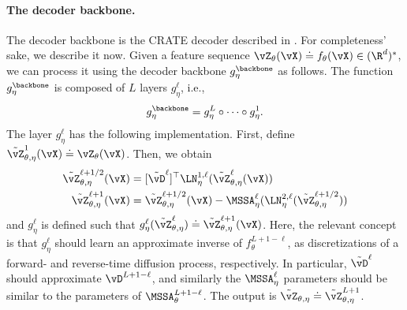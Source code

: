 \documentclass[../../book-main.tex]{subfiles}
\begin{document}
\paragraph{The decoder backbone.} The decoder backbone is the CRATE decoder described in . For completeness' sake, we describe it now. Given a feature sequence \(\vZ_{\theta}(\vX) \doteq f_{\theta}(\vX) \in (\R^{d})^{*}\), we can process it using the decoder backbone \(g_{\eta}^{\backbone}\) as follows. The function \(g_{\eta}^{\backbone}\) is composed of \(L\) layers \(g_{\eta}^{\ell}\), i.e.,
\begin{equation}
    g_{\eta}^{\backbone} = g_{\eta}^{L} \circ \cdots \circ g_{\eta}^{1}.
\end{equation}
The layer \(g_{\eta}^{\ell}\) has the following implementation. First, define \(\tilde{\vZ}_{\theta, \eta}^{1}(\vX) \doteq \vZ_{\theta}(\vX)\). Then, we obtain
\begin{align}
    \tilde{\vZ}_{\theta, \eta}^{\ell + 1/2}(\vX) 
    &= [\tilde{\vD}^{\ell}]^{\top}\LN_{\eta}^{1, \ell}(\tilde{\vZ}_{\theta, \eta}^{\ell}(\vX)) \\ 
    \tilde{\vZ}_{\theta, \eta}^{\ell + 1}(\vX)
    &= \tilde{\vZ}_{\theta, \eta}^{\ell + 1/2}(\vX) - \MSSA_{\eta}^{\ell}(\LN_{\eta}^{2, \ell}(\tilde{\vZ}_{\theta, \eta}^{\ell + 1/2}))
\end{align}
and \(g_{\eta}^{\ell}\) is defined such that \(g_{\eta}^{\ell}(\tilde{\vZ}_{\theta, \eta}^{\ell}) \doteq \tilde{\vZ}_{\theta, \eta}^{\ell + 1}(\vX)\). Here, the relevant concept is that \(g_{\eta}^{\ell}\) should learn an approximate inverse of \(f_{\theta}^{L + 1 - \ell}\), as discretizations of a forward- and reverse-time diffusion process, respectively. In particular, \(\tilde{\vD}^{\ell}\) should approximate \(\vD^{L + 1 - \ell}\), and similarly the \(\MSSA_{\eta}^{\ell}\) parameters should be similar to the parameters of \(\MSSA_{\theta}^{L + 1 - \ell}\). The output is \(\tilde{\vZ}_{\theta, \eta} \doteq \tilde{\vZ}_{\theta, \eta}^{L + 1}\).
\end{document}

